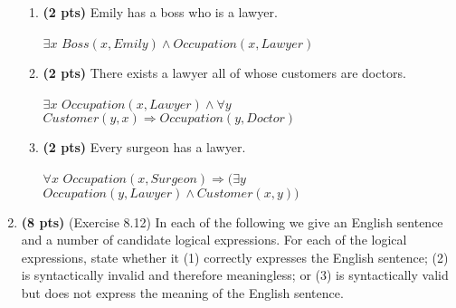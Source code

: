 \documentclass{article}
\begin{document}
\begin{enumerate}
\begin{enumerate}[label=($\alph*$)]

    \item \textbf{(2 pts)} Emily has a boss who is a lawyer.

    \color{blue}
        $\exists x$ $Boss(x, Emily) \wedge Occupation(x, Lawyer)$
    \color{black}



    \item \textbf{(2 pts)} There exists a lawyer all of whose customers are doctors.

    \color{blue}
        $\exists x$ $Occupation(x, Lawyer) \wedge \forall y$ $Customer(y, x) \Rightarrow Occupation(y, Doctor)$
    \color{black}



    \item \textbf{(2 pts)} Every surgeon has a lawyer.

    \color{blue}
        $\forall x$ $Occupation(x, Surgeon) \Rightarrow (\exists y$ $Occupation(y, Lawyer) \wedge Customer(x, y))$
    \color{black}

    
    \end{enumerate}



\item \textbf{(8 pts)} (Exercise 8.12) In each of the following we give an English sentence and a number of candidate logical expressions. For each of the logical expressions, state whether it (1) correctly expresses the English sentence; (2) is syntactically invalid and therefore meaningless; or (3) is syntactically valid but does not express the meaning of the English sentence.

    \begin{enumerate}[label=($\alph*$)]


\end{enumerate}
\end{enumerate}
\end{document}
